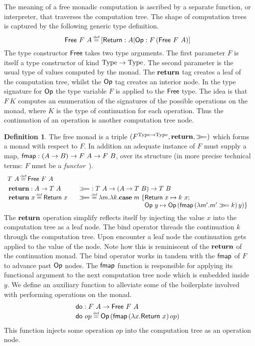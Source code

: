 \documentclass[12pt,phd,lfcs,twoside,openright,logo,leftchapter,normalheadings]{infthesis}
\theoremstyle{plain}
\theoremstyle{definition}
\newtheorem{definition}[theorem]{Definition}
\begin{document}
The meaning of a free monadic computation is ascribed by a separate
function, or interpreter, that traverses the computation tree.
%
The shape of computation trees is captured by the following generic
type definition.
%
\[
  \Free~F~A \defas [\return:A|\OpF:F\,(\Free~F~A)]
\]
%
The type constructor $\mathsf{Free}$ takes two type arguments. The first
parameter $F$ is itself a type constructor of kind
$\textrm{Type} \to \textrm{Type}$. The second parameter is the usual type of
values computed by the monad. The $\mathbf{return}$ tag creates a leaf of the
computation tree, whilst the $\mathsf{Op}$ tag creates an interior node. In
the type signature for $\mathsf{Op}$ the type variable $F$ is applied to the
$\mathsf{Free}$ type. The idea is that $F~K$ computes an enumeration of the
signatures of the possible operations on the monad, where $K$ is the
type of continuation for each operation. Thus the continuation of an
operation is another computation tree node.
%
\begin{definition} The free monad is a triple
  $(F^{\textrm{Type} \to \textrm{Type}}, \mathbf{return}, \gg\!=)$ which forms a monad
  with respect to $F$. In addition an adequate instance of $F$ must
  supply a map, $\mathsf{fmap} : (A \to B) \to F~A \to F~B$, over its
  structure (in more precise technical terms: $F$ must be a
  \emph{functor}~\cite{Borceux94}).
  \[
   \bl
     \ba{@{~}l@{\,\quad}@{~}r}
     \multicolumn{2}{l}{T~A \defas \Free~F~A} \smallskip\\
     \multirow{2}{*}{
       \bl
         \Return : A \to T~A\\
         \Return~x \defas \return~x
         \el} &
     \multirow{2}{*}{
       \bl
         \bind ~: T~A \to (A \to T~B) \to T~B\\
         \bind ~\defas \lambda m.\lambda k.\Case\;m\;\{
           \bl
              \return~x \mapsto k~x;\\
              \OpF~y    \mapsto \OpF\,(\fmap\,(\lambda m'. m' \bind k)\,y)\}
           \el
         \el}\\ & \\ &
       \ea
     \el
   \]
   The $\mathbf{return}$ operation simplify reflects itself by injecting the
   value $x$ into the computation tree as a leaf node. The bind
   operator threads the continuation $k$ through the computation
   tree. Upon encounter a leaf node the continuation gets applied to
   the value of the node. Note how this is reminiscent of the
   $\mathbf{return}$ of the continuation monad. The bind operator works in
   tandem with the $\mathsf{fmap}$ of $F$ to advance past $\mathsf{Op}$ nodes. The
   $\mathsf{fmap}$ function is responsible for applying its functional
   argument to the next computation tree node which is embedded inside
   $y$.
   We define an auxiliary function to alleviate some of the
   boilerplate involved with performing operations on the monad.
   \[
     \bl
       \DoF : F~A \to \Free~F~A\\
       \DoF~op \defas \OpF\,(\fmap\,(\lambda x.\return~x)\,op)
     \el
  \]
  This function injects some operation $op$ into the computation tree
  as an operation node.
\end{definition}
\end{document}
